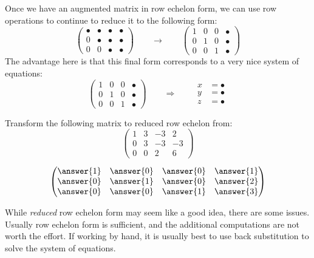 \documentclass{ximera}
\begin{document}
Once we have an augmented matrix in row echelon form, we can use row
operations to continue to reduce it to the following form:
\[
\begin{pmatrix}
  \bullet & \bullet & \bullet & \bullet \\
     0   & \bullet & \bullet & \bullet \\
     0  &    0 & \bullet & \bullet
\end{pmatrix}
\qquad\longrightarrow\qquad
\begin{pmatrix}
  1 & 0 & 0  & \bullet \\
     0   & 1  &  0 & \bullet \\
     0  &    0 & 1 & \bullet
\end{pmatrix}
\]
The advantage here is that this final form corresponds to a very nice system of equations:
\[
  \left(
    \begin{array}{ccc|c}
      1 &   0 & 0 & \bullet  \\
      0 &   1 & 0 & \bullet \\
      0& 0  &  1 & \bullet
    \end{array}
  \right)
  \qquad\Longrightarrow\qquad
  \begin{aligned}
    x &= \bullet  \\
    y &= \bullet  \\
    z &=\bullet
  \end{aligned}
\]
\begin{question}
  Transform the following matrix to reduced row echelon from:
  \[
  \begin{pmatrix}
  1 & 3 & -3 & 2  \\
  0 & 3 & -3 & -3 \\
  0 & 0 &  2 & 6
  \end{pmatrix}
  \]
  \begin{prompt}
    \[
    \begin{pmatrix}
      \answer{1} & \answer{0} & \answer{0} & \answer{1} \\
      \answer{0} & \answer{1} & \answer{0} & \answer{2} \\
      \answer{0} & \answer{0} & \answer{1} & \answer{3}
    \end{pmatrix}
    \]
  \end{prompt}
\end{question}
While \textit{reduced} row echelon form may seem like a good idea,
there are some issues.  Usually row echelon form is sufficient, and
the additional computations are not worth the effort.  If working by
hand, it is usually best to use back substitution to solve the system of equations.
\end{document}
